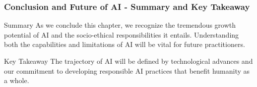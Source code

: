 \documentclass[aspectratio=169]{beamer}
\begin{document}
\begin{frame}[fragile]
    \frametitle{Conclusion and Future of AI - Summary and Key Takeaway}
    
    \begin{block}{Summary}
        As we conclude this chapter, we recognize the tremendous growth potential of AI and the socio-ethical responsibilities it entails. Understanding both the capabilities and limitations of AI will be vital for future practitioners.
    \end{block}

    \begin{block}{Key Takeaway}
        The trajectory of AI will be defined by technological advances and our commitment to developing responsible AI practices that benefit humanity as a whole.
    \end{block}
\end{frame}
\end{document}
